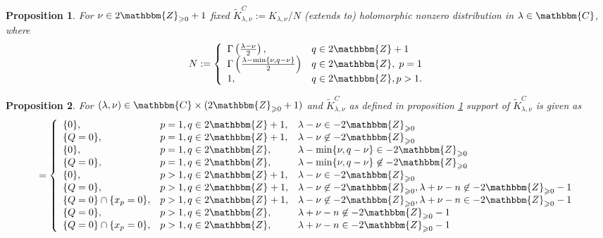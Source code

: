 \documentclass{article}
\newcommand{\assign}{:=}
\newcommand{\nin}{\not\in}
\numberwithin{definition}{section}
\numberwithin{lemma}{section}
\newtheorem{proposition}{Proposition}
\numberwithin{proposition}{section}
{\theorembodyfont{\rmfamily}\newtheorem{remark}{Remark}
\numberwithin{remark}{section}
}
\begin{document}
\begin{proposition}
  \label{KC-normalization-2:prop-normalization}For $\nu \in
  2\mathbbm{Z}_{\geqslant 0} + 1$ fixed $\tilde{K}_{\lambda, \nu}^C \assign
  K_{\lambda, \nu} / N$ (extends to) holomorphic nonzero distribution in
  $\lambda \in \mathbbm{C}$, where
  \[ N \assign \left\{ \begin{array}{ll}
       \Gamma \left( \frac{\lambda - \nu}{2} \right), & q \in 2\mathbbm{Z}+
       1\\
       \Gamma \left( \frac{\lambda - \min \{ \nu, q - \nu \}}{2} \right) & q
       \in 2\mathbbm{Z}, \; p = 1\\
       1, & q \in 2\mathbbm{Z}, p > 1.
     \end{array} \right. \]
\end{proposition}

\begin{proposition}
  \label{KC-normalization-2:prop-supp}For $( \lambda, \nu) \in \mathbbm{C}
  \times ( 2\mathbbm{Z}_{\geqslant 0} + 1)$ and $\tilde{K}_{\lambda, \nu}^C$
  as defined in proposition \ref{KC-normalization-2:prop-normalization}
  support of $\tilde{K}_{\lambda, \nu}^C$ is given as
  \[ = \left\{ \begin{array}{lll}
       \{ 0 \}, & p = 1, q \in 2\mathbbm{Z}+ 1, & \lambda - \nu \in -
       2\mathbbm{Z}_{\geqslant 0}\\
       \{ Q = 0 \}, & p = 1, q \in 2\mathbbm{Z}+ 1, & \lambda - \nu \nin -
       2\mathbbm{Z}_{\geqslant 0}\\
       \{ 0 \}, & p = 1, q \in 2\mathbbm{Z}, & \lambda - \min \{ \nu, q - \nu
       \} \in - 2\mathbbm{Z}_{\geqslant 0}\\
       \{ Q = 0 \}, & p = 1, q \in 2\mathbbm{Z}, & \lambda - \min \{ \nu, q -
       \nu \} \nin - 2\mathbbm{Z}_{\geqslant 0}\\
       \{ 0 \}, & p > 1, q \in 2\mathbbm{Z}+ 1, & \lambda - \nu \in -
       2\mathbbm{Z}_{\geqslant 0}\\
       \{ Q = 0 \}, & p > 1, q \in 2\mathbbm{Z}_{} + 1, & \lambda - \nu \nin -
       2\mathbbm{Z}_{\geqslant 0}, \lambda + \nu - n \nin -
       2\mathbbm{Z}_{\geqslant 0} - 1\\
       \{ Q = 0 \} \cap \{ x_p = 0 \}, & p > 1, q \in 2\mathbbm{Z}_{} + 1, &
       \lambda - \nu \nin - 2\mathbbm{Z}_{\geqslant 0}, \lambda + \nu - n \in
       - 2\mathbbm{Z}_{\geqslant 0} - 1\\
       \{ Q = 0 \}, & p > 1, q \in 2\mathbbm{Z}, & \lambda + \nu - n \nin -
       2\mathbbm{Z}_{\geqslant 0} - 1\\
       \{ Q = 0 \} \cap \{ x_p = 0 \}, & p > 1, q \in 2\mathbbm{Z}, & \lambda
       + \nu - n \in - 2\mathbbm{Z}_{\geqslant 0} - 1
     \end{array} \right. \]
\end{proposition}
\end{document}
